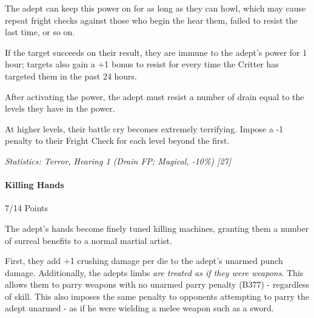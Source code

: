 \begin{multicols*}{3}
		The adept can keep this power on for as long as they can howl, which may cause repeat fright checks against those who begin the hear them, failed to resist the last time, or so on.
		
		If the target succeeds on their result, they are immune to the adept’s power for 1 hour; targets also gain a +1 bonus to resist for every time the Critter has targeted them in the past 24 hours. 
		
		 After activating the power, the adept must resist a number of drain equal to the levels they have in the power.
		
		At higher levels, their battle cry becomes extremely terrifying. Impose a -1 penalty to their Fright Check for each level beyond the first.

		\begin{center} 
			\begin{adjustwidth}{-0mm}{}
			\end{adjustwidth}
		\end{center}
	
		\textcolor{OliveGreen}{\textit{Statistics: Terror, Hearing 1 (Drain FP; Magical, -10\%) [27]}}
	
	\paragraph{Killing Hands}
	\begin{flushright}
		7/14 Points
	\end{flushright}

		The adept's hands become finely tuned killing machines, granting them a number of surreal benefits to a normal martial artist.
		
		First, they add +1 crushing damage per die to the adept's unarmed punch damage. Additionally, the adepts limbs \textit{are treated as if they were weapons}. This allows them to parry weapons with no unarmed parry penalty (B377) - regardless of skill. This also imposes the same penalty to opponents attempting to parry the adept unarmed - as if he were wielding a melee weapon such as a sword. 
		

\end{multicols*}
